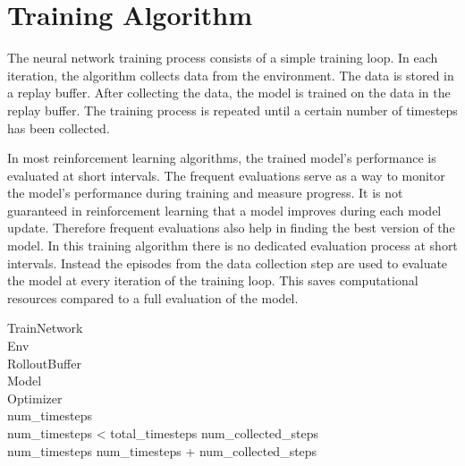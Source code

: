 \section{Training Algorithm}



The neural network training process consists of a simple training loop. In each iteration, the algorithm collects data from the environment. The data is stored in a replay buffer. After collecting the data, the model is trained on the data in the replay buffer. The training process is repeated until a certain number of timesteps has been collected.  

In most reinforcement learning algorithms, the trained model's performance is evaluated at short intervals. The frequent evaluations serve as a way to monitor the model's performance during training and measure progress. It is not guaranteed in reinforcement learning that a model improves during each model update. Therefore frequent evaluations also help in finding the best version of the model.  
In this training algorithm there is no dedicated evaluation process at short intervals. Instead the episodes from the data collection step are used to evaluate the model at every iteration of the training loop. This saves computational resources compared to a full evaluation of the model.

\renewcommand{\thepseudonum}{\roman{pseudonum}}
\begin{pseudocode}{TrainNetwork}{ }
\label{train_network}
\\

\MAIN
Env \GETS {}\\
RolloutBuffer \GETS {}\\
Model \GETS {}\\
Optimizer \GETS {}\\

num\_timesteps \\
\WHILE num\_timesteps < total\_timesteps \DO 
\BEGIN 
num\_collected\_steps \GETS {}\\
num\_timesteps \GETS num\_timesteps + num\_collected\_steps\\
\\
\END\\
\ENDMAIN
\end{pseudocode}

